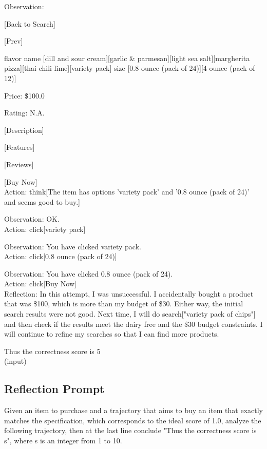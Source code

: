 \documentclass{article} \usepackage{iclr2024_conference,times}
\begin{document}
Observation:

[Back to Search]

[Prev]

flavor name [dill and sour cream][garlic \& parmesan][light sea salt][margherita pizza][thai chili lime][variety pack]
size [0.8 ounce (pack of 24)][4 ounce (pack of 12)]

Price: \$100.0

Rating: N.A.

[Description]

[Features]

[Reviews]

[Buy Now]
\\

Action: think[The item has options 'variety pack' and '0.8 ounce (pack of 24)' and seems good to buy.]

Observation: OK.
\\

Action: click[variety pack]

Observation: You have clicked variety pack.
\\

Action: click[0.8 ounce (pack of 24)]

Observation: You have clicked 0.8 ounce (pack of 24).
\\

Action: click[Buy Now]
\\

Reflection: In this attempt, I was unsuccessful. I accidentally bought a product that was \$100, which is more than my budget of \$30. Either way, the initial search results were not good. Next time, I will do search["variety pack of chips"] and then check if the results meet the dairy free and the \$30 budget constraints. I will continue to refine my searches so that I can find more products.

Thus the correctness score is 5
\\

(input)

\subsection{Reflection Prompt}

Given an item to purchase and a trajectory that aims to buy an item that exactly matches the specification, which corresponds to the ideal score of 1.0, analyze the following trajectory, then at the last line conclude "Thus the correctness score is {s}", where s is an integer from 1 to 10.
\end{document}
